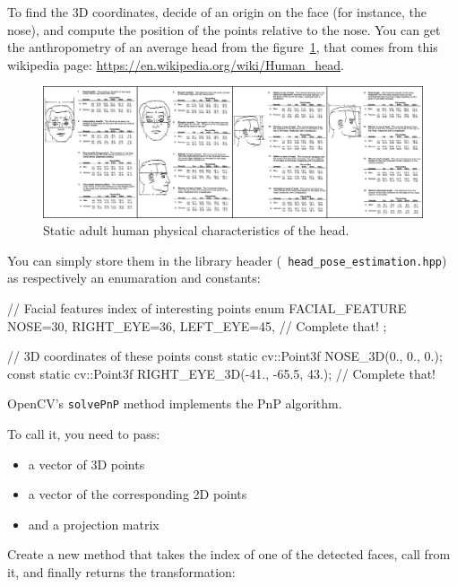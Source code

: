 \documentclass{instructions}
\begin{document}
To find the 3D coordinates, decide of an origin on the face (for instance, the
nose), and compute the position of the points relative to the nose. You can get
the anthropometry of an average head from the figure~\ref{head}, that comes from
this wikipedia page: \url{https://en.wikipedia.org/wiki/Human_head}.

\begin{figure}
    \centering
    \includegraphics[width=1.\linewidth]{figs/headanthropometry}
    \caption{Static adult human physical characteristics of the head.}
    \label{head}
\end{figure}


You can simply store them in the library header ({\tt
head\_pose\_estimation.hpp}) as respectively an enumaration and constants:

\begin{cppcode}
// Facial features index of interesting points
enum FACIAL_FEATURE {
    NOSE=30,
    RIGHT_EYE=36,
    LEFT_EYE=45,
    // Complete that!
};

// 3D coordinates of these points
const static cv::Point3f NOSE_3D(0., 0., 0.);
const static cv::Point3f RIGHT_EYE_3D(-41., -65.5, 43.);
// Complete that!
\end{cppcode}




OpenCV's {\tt solvePnP} method implements the PnP algorithm.

To call it, you need to pass:
\begin{itemize}
    \item a vector of 3D points
    \item a vector of the corresponding 2D points
    \item and a projection matrix
\end{itemize}

Create a new method  that takes
the index of one of the detected faces, call  from it, and
finally returns the transformation:
\end{document}

